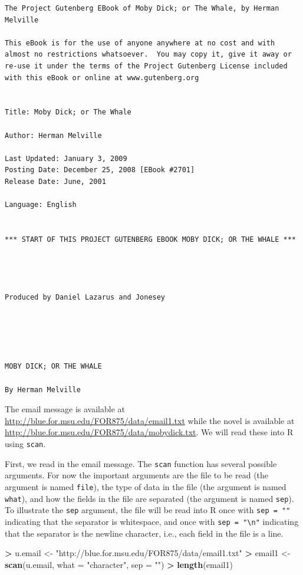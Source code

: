 \documentclass[]{krantz}
\makeatletter
\newenvironment{Shaded}{\begin{snugshade}}{\end{snugshade}}
\newcommand{\DataTypeTok}[1]{\textcolor[rgb]{0.27,0.27,0.27}{#1}}
\newcommand{\KeywordTok}[1]{\textcolor[rgb]{0.27,0.27,0.27}{\textbf{#1}}}
\newcommand{\NormalTok}[1]{#1}
\newcommand{\OperatorTok}[1]{\textcolor[rgb]{0.43,0.43,0.43}{\textbf{#1}}}
\newcommand{\StringTok}[1]{\textcolor[rgb]{0.5,0.5,0.5}{#1}}
\newenvironment{kframe}{%
\medskip{}
\setlength{\fboxsep}{.8em}
 \def\at@end@of@kframe{}%
 \ifinner\ifhmode%
  \def\at@end@of@kframe{\end{minipage}}%
  \begin{minipage}{\columnwidth}%
 \fi\fi%
 \def\FrameCommand##1{\hskip\@totalleftmargin \hskip-\fboxsep
 \colorbox{shadecolor}{##1}\hskip-\fboxsep
     \hskip-\linewidth \hskip-\@totalleftmargin \hskip\columnwidth}%
 \MakeFramed {\advance\hsize-\width
   \@totalleftmargin\z@ \linewidth\hsize
   \@setminipage}}%
 {\par\unskip\endMakeFramed%
 \at@end@of@kframe}
\renewenvironment{Shaded}{\begin{kframe}}{\end{kframe}}
\makeatother
\begin{document}
\begin{verbatim}
The Project Gutenberg EBook of Moby Dick; or The Whale, by Herman Melville

This eBook is for the use of anyone anywhere at no cost and with
almost no restrictions whatsoever.  You may copy it, give it away or
re-use it under the terms of the Project Gutenberg License included
with this eBook or online at www.gutenberg.org


Title: Moby Dick; or The Whale

Author: Herman Melville

Last Updated: January 3, 2009
Posting Date: December 25, 2008 [EBook #2701]
Release Date: June, 2001

Language: English


*** START OF THIS PROJECT GUTENBERG EBOOK MOBY DICK; OR THE WHALE ***




Produced by Daniel Lazarus and Jonesey





MOBY DICK; OR THE WHALE

By Herman Melville
\end{verbatim}

The email message is available at \url{http://blue.for.msu.edu/FOR875/data/email1.txt} while the novel is available at \url{http://blue.for.msu.edu/FOR875/data/mobydick.txt}. We will read these into R using \texttt{scan}.

First, we read in the email message. The \texttt{scan} function has several possible arguments. For now the important arguments are the file to be read (the argument is named \texttt{file}), the type of data in the file (the argument is named \texttt{what}), and how the fields in the file are separated (the argument is named \texttt{sep}). To illustrate the \texttt{sep} argument, the file will be read into R once with \texttt{sep\ =\ ""} indicating that the separator is whitespace, and once with \texttt{sep\ =\ "\textbackslash{}n"} indicating that the separator is the newline character, i.e., each field in the file is a line.

\begin{Shaded}
\begin{Highlighting}[]
\OperatorTok{>}\StringTok{ }\NormalTok{u.email <-}\StringTok{ "http://blue.for.msu.edu/FOR875/data/email1.txt"}
\OperatorTok{>}\StringTok{ }\NormalTok{email1 <-}\StringTok{ }\KeywordTok{scan}\NormalTok{(u.email, }\DataTypeTok{what =} \StringTok{"character"}\NormalTok{, }\DataTypeTok{sep =} \StringTok{""}\NormalTok{)}
\OperatorTok{>}\StringTok{ }\KeywordTok{length}\NormalTok{(email1)}
\end{Highlighting}
\end{Shaded}
\end{document}
